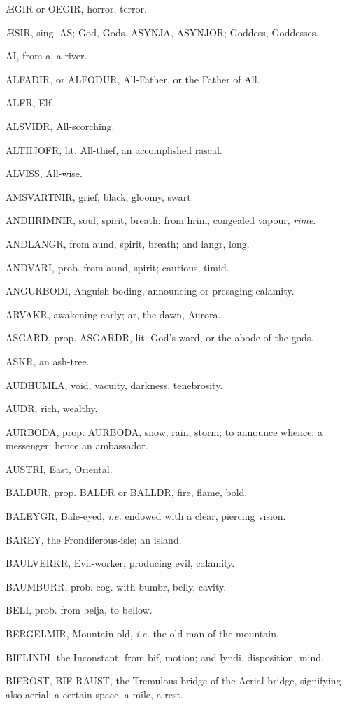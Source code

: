 
ÆGIR or OEGIR, horror, terror.

ÆSIR, sing. AS; God, Gods. ASYNJA, ASYNJOR; Goddess, Goddesses.

AI, from a, a river.

ALFADIR, or ALFODUR, All-Father, or the Father of All.

ALFR, Elf.

ALSVIDR, All-scorching.

ALTHJOFR, lit. All-thief, an accomplished rascal.

ALVISS, All-wise.

AMSVARTNIR, grief, black, gloomy, swart.

ANDHRIMNIR, soul, spirit, breath: from hrim, congealed vapour, \emph{rime}.

ANDLANGR, from aund, spirit, breath; and langr, long.

ANDVARI, prob. from aund, spirit; cautious, timid.

ANGURBODI, Anguish-boding, announcing or presaging calamity.

ARVAKR, awakening early; ar, the dawn, Aurora.

ASGARD, prop. ASGARDR, lit. God's-ward, or the abode of the gods.

ASKR, an ash-tree.

AUDHUMLA, void, vacuity, darkness, tenebrosity.

AUDR, rich, wealthy.

AURBODA, prop. AURBODA, snow, rain, storm; to announce whence; a
messenger; hence an ambassador.

AUSTRI, East, Oriental.

BALDUR, prop. BALDR or BALLDR, fire, flame, bold.

BALEYGR, Bale-eyed, \emph{i.e.} endowed with a clear, piercing vision.

BAREY, the Frondiferous-isle; an island.

BAULVERKR, Evil-worker; producing evil, calamity.

BAUMBURR, prob. cog. with bumbr, belly, cavity.

BELI, prob. from belja, to bellow.

BERGELMIR, Mountain-old, \emph{i.e.} the old man of the mountain.

BIFLINDI, the Inconstant: from bif, motion; and lyndi, disposition,
mind.

BIFROST, BIF-RAUST, the Tremulous-bridge of the Aerial-bridge,
signifying also aerial: a certain space, a mile, a rest.


